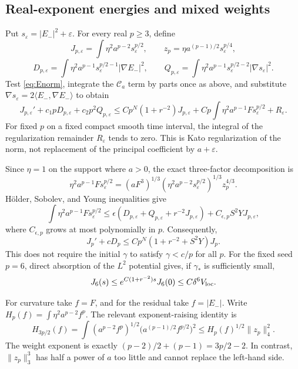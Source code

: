 \documentclass[a4paper,11pt]{article}
\numberwithin{equation}{section}
\theoremstyle{definition}
\begin{document}
\subsection{Real-exponent energies and mixed weights}
Put $s_\varepsilon=|E_-|^2+\varepsilon$. For every real $p\ge3$, define
\[
J_{p,\varepsilon}=\int\eta^2a^{p-2}s_\varepsilon^{p/2},\qquad
z_p=\eta a^{(p-1)/2}s_\varepsilon^{p/4},
\]
\[
D_{p,\varepsilon}=\int\eta^2a^{p-1}s_\varepsilon^{p/2-1}|\nabla E_-|^2,\qquad
Q_{p,\varepsilon}=\int\eta^2a^{p-1}s_\varepsilon^{p/2-2}|\nabla s_\varepsilon|^2.
\]
Test \eqref{eq:Enorm}, integrate the $\mathcal C_a$ term by parts once as above,
and substitute $\nabla s_\varepsilon=2\langle E_-,\nabla E_-\rangle$ to obtain
\[
J_{p,\varepsilon}'+c_1pD_{p,\varepsilon}+c_2p^2Q_{p,\varepsilon}
\le Cp^N(1+r^{-2})J_{p,\varepsilon}
+Cp\int\eta^2a^{p-1}F s_\varepsilon^{p/2}+R_\varepsilon.
\]
For fixed $p$ on a fixed compact smooth time interval, the integral of the regularization remainder $R_\varepsilon$ tends to zero. This is Kato regularization of the norm, not replacement of the principal coefficient by $a+\varepsilon$.

Since $\eta=1$ on the support where $a>0$, the exact three-factor decomposition is
\[
\eta^2a^{p-1}F s_\varepsilon^{p/2}
=(aF^3)^{1/3}
(\eta^2a^{p-2}s_\varepsilon^{p/2})^{1/3}z_p^{4/3}.
\]
H\"older, Sobolev, and Young inequalities give
\[
\int\eta^2a^{p-1}F s_\varepsilon^{p/2}
\le\epsilon(D_{p,\varepsilon}+Q_{p,\varepsilon}+r^{-2}J_{p,\varepsilon})
+C_{\epsilon,p}S^2YJ_{p,\varepsilon},
\]
where $C_{\epsilon,p}$ grows at most polynomially in $p$. Consequently,
\begin{equation}\label{eq:realp}
J_p'+cD_p\le Cp^N(1+r^{-2}+S^2Y)J_p.
\end{equation}
This does not require the initial $\gamma$ to satisfy $\gamma<c/p$ for all $p$. For the fixed seed $p=6$, direct absorption of the $L^2$ potential gives, if $\gamma_*$ is sufficiently small,
\[
J_6(s)\le e^{C(1+r^{-2})s}J_6(0)
\le C\delta^6V_{\rm loc}.
\]

For curvature take $f=F$, and for the residual take $f=|E_-|$. Write
$H_p(f)=\int\eta^2a^{p-2}f^p$. The relevant exponent-raising identity is
\begin{equation}\label{eq:mixed-recurrence}
H_{3p/2}(f)
=\int(a^{p-2}f^p)^{1/2}
\bigl(a^{(p-1)/2}f^{p/2}\bigr)^2
\le H_p(f)^{1/2}\|z_p\|_4^2.
\end{equation}
The weight exponent is exactly $(p-2)/2+(p-1)=3p/2-2$.
In contrast, $\|z_p\|_3^3$ has half a power of $a$ too little and cannot replace the left-hand side.
\end{document}
